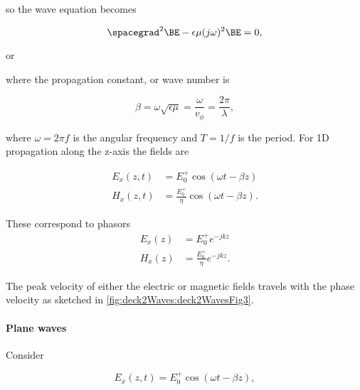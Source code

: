 so the wave equation becomes

\begin{equation}\label{eqn:uwavesLecture2:940}
\spacegrad^2 \BE - \epsilon \mu (j\omega)^2 \BE = 0,
\end{equation}

or

where the propagation constant, or wave number is

\begin{equation}\label{eqn:uwavesLecture2:980}
\beta = \omega \sqrt{\epsilon \mu} = \frac{\omega}{v_\phi} = \frac{2 \pi}{\lambda},
\end{equation}

where \( \omega = 2 \pi f \) is the angular frequency and \( T = 1/f \) is the period.  For 1D propagation along the z-axis the fields are

\begin{equation}\label{eqn:uwavesLecture2:1000}
\begin{aligned}
E_x(z, t) &= E_0^{+} \cos(\omega t - \beta z) \\
H_x(z, t) &= \frac{E_0^{+}}{\eta} \cos(\omega t - \beta z).
\end{aligned}
\end{equation}

These correspond to phasors
\begin{equation}\label{eqn:uwavesLecture2:1020}
\begin{aligned}
E_x(z) &= E_0^{+} e^{-j k z } \\
H_x(z) &= \frac{E_0^{+}}{\eta} e^{-j k z }.
\end{aligned}
\end{equation}

The peak velocity of either the electric or magnetic fields travels with the phase velocity as sketched in \cref{fig:deck2Waves:deck2WavesFig3}.


\paragraph{Plane waves}

Consider

\begin{equation}\label{eqn:uwavesLecture2:1040}
E_x(z, t) = E_0^{+} \cos(\omega t - \beta z),
\end{equation}

